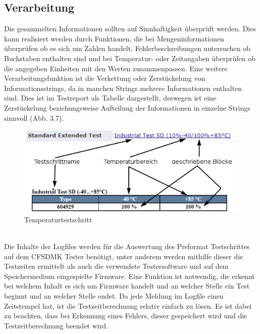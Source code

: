 	\vspace{5mm}

\subsection{Verarbeitung}
Die gesammelten Informationen sollten auf Sinnhaftigkeit überprüft werden. Dies kann realisiert werden durch Funktionen, die bei Mengeninformationen überprüfen ob es sich um Zahlen handelt, Fehlerbeschreibungen untersuchen ob Buchstaben enthalten sind und bei Temperatur- oder Zeitangaben überprüfen ob die angegeben Einheiten mit den Werten zusammenpassen. Eine weitere Verarbeitungsfunktion ist die Verkettung oder Zerstückelung von Informationsstrings, da in manchen Strings mehrere Informationen enthalten sind. Dies ist im Testreport als Tabelle dargestellt, deswegen ist eine Zerstückelung beziehungsweise Aufteilung der Informationen in einzelne Strings sinnvoll (Abb. 3.7).
\begin{figure}[!htbp]
\centering
\includegraphics[scale=0.7]{images/extempString}
\caption{Temperaturtestschritt}
\label{fig:Temperaturtestschritt}
\end{figure}
\\
Die Inhalte der Logfiles werden für die Auswertung des Preformat Testschrittes auf dem \ac{CFSDMK} Tester benötigt, unter anderem werden mithilfe dieser die Testzeiten ermittelt als auch die verwendete Testersoftware und auf dem Speichermedium eingespielte Firmware. Eine Funktion ist notwendig, die erkennt bei welchem Inhalt es sich um Firmware handelt und an welcher Stelle ein Test beginnt und an welcher Stelle endet. Da jede Meldung im Logfile einen Zeitstempel hat, ist die Testzeitberechnung relativ einfach zu lösen. Es ist dabei zu beachten, dass bei Erkennung eines Fehlers, dieser gespeichert wird und die Testzeitberechnung beendet wird.

	\vspace{5mm}
	
